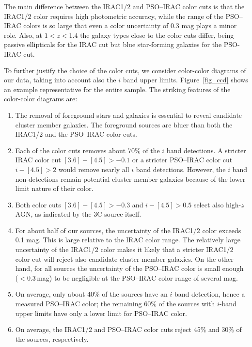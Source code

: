 \documentclass[mathleft,fleqn,%
]{an}
\begin{document}
The main difference between the IRAC1/2 and PSO--IRAC color cuts is that the IRAC1/2
color requires high photometric accuracy, while
the range of the PSO--IRAC colors is so large that even a color
uncertainty of 0.3 mag plays a minor role.
Also, at  $1<z<1.4$ the galaxy types close to the color cuts
differ, being passive ellipticals for the IRAC cut but blue
star-forming galaxies for the PSO-IRAC cut.

To further justify the choice of the color cuts, 
we consider color-color
diagrams of our data, taking into account 
also the $i$ band upper limits. 
Figure~\ref{fig_ccd} shows an example representative for the entire sample. 
The striking features of
the color-color diagrams are:

\begin{enumerate}
\item 
  The removal of foreground stars and galaxies is essential to reveal candidate 
  cluster member galaxies.
  The foreground sources  are bluer than both 
  the IRAC1/2 and the PSO--IRAC color cuts.

\item
  Each of the color
  cuts removes about 70\%  of the $i$ band detections.
  A stricter IRAC color cut $[3.6] - [4.5] > -0.1$ or 
  a stricter PSO--IRAC color cut $i - [4.5] > 2$ would remove nearly
  all $i$ band detections. 
  However, the $i$ band non-detections remain potential 
  cluster member galaxies because of the lower limit nature of their
  color.

\item
  Both color cuts $[3.6] - [4.5] > -0.3$ and $i - [4.5] > 0.5$ 
  select also high-$z$ AGN, as indicated by the 3C
  source itself.

\item
  For about half of our sources, 
  the uncertainty of the IRAC1/2 color exceeds
  0.1 mag. This is large relative to the IRAC color range.
  The relatively large uncertainty of the IRAC1/2 color makes it
  likely that a stricter IRAC1/2 color cut will
  reject also candidate cluster member galaxies.
  On the other hand, for all sources 
  the uncertainty of the PSO--IRAC color is small enough ($<$0.3\,mag) to be
  negligible at the PSO--IRAC color range of several mag. 

\item
  On average, only about 40\% of the sources 
  have an $i$ band detection, hence a measured PSO--IRAC color; the
  remaining 60\% of the sources with $i$-band upper limits 
  have only a lower limit for PSO--IRAC color.
  

\item
  On average, the IRAC1/2 and PSO--IRAC color cuts reject 45\%
  and 30\%  of the sources, respectively.
\end{enumerate}
\end{document}
